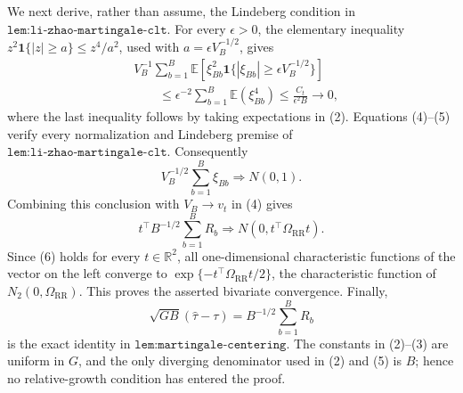 We next derive, rather than assume, the Lindeberg condition in \(\texttt{lem:li-zhao-martingale-clt}\).  For every \(\epsilon>0\), the elementary inequality \(z^2\mathbf1\{|z|\ge a\}\le z^4/a^2\), used with \(a=\epsilon V_B^{-1/2}\), gives
\[
 \begin{aligned}
 &V_B^{-1}\sum_{b=1}^B
  \mathbb E\left[\xi_{Bb}^2
   \mathbf1\{|\xi_{Bb}|\ge\epsilon V_B^{-1/2}\}\right]\\
 &\qquad\le
 \epsilon^{-2}\sum_{b=1}^B\mathbb E(\xi_{Bb}^4)
 \le \frac{C_t}{\epsilon^2B}\longrightarrow0,             \tag{5}
 \end{aligned}
\]
where the last inequality follows by taking expectations in (2).  Equations (4)--(5) verify every normalization and Lindeberg premise of \(\texttt{lem:li-zhao-martingale-clt}\).  Consequently
\[
 V_B^{-1/2}\sum_{b=1}^B\xi_{Bb}\Rightarrow N(0,1).
\]
Combining this conclusion with \(V_B\to v_t\) in (4) gives
\[
 t^\top B^{-1/2}\sum_{b=1}^BR_b
 \Rightarrow N(0,t^\top\Omega_{\mathrm{RR}}t).             \tag{6}
\]
Since (6) holds for every \(t\in\mathbb R^2\), all one-dimensional characteristic functions of the vector on the left converge to
\(\exp\{-t^\top\Omega_{\mathrm{RR}}t/2\}\), the characteristic function of \(N_2(0,\Omega_{\mathrm{RR}})\).  This proves the asserted bivariate convergence.  Finally,
\[
 \sqrt{GB}(\widehat\tau-\tau)
 =B^{-1/2}\sum_{b=1}^BR_b
\]
is the exact identity in \(\texttt{lem:martingale-centering}\).  The constants in (2)--(3) are uniform in \(G\), and the only diverging denominator used in (2) and (5) is \(B\); hence no relative-growth condition has entered the proof.